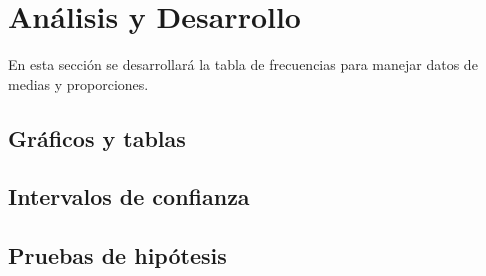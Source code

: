 \section{Análisis y Desarrollo}

En esta sección se desarrollará la tabla de frecuencias para manejar datos de medias y proporciones.

\subsection{Gráficos y tablas}

\subsection{Intervalos de confianza}

\subsection{Pruebas de hipótesis}




  

  
  
  
  
  
  

